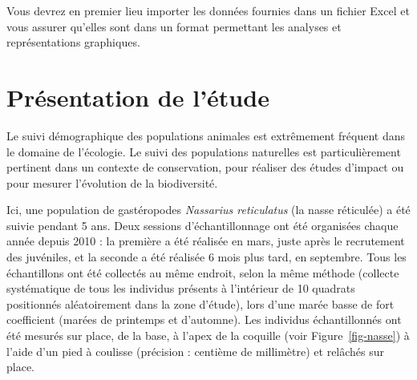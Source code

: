 \documentclass[
  a4paper,
  DIV=11,
  numbers=noendperiod,
  oneside]{scrreprt}
\begin{document}
Vous devrez en premier lieu importer les données fournies dans un
fichier Excel et vous assurer qu'elles sont dans un format permettant
les analyses et représentations graphiques.

\hypertarget{sec-pres}{%
\section{Présentation de l'étude}\label{sec-pres}}

Le suivi démographique des populations animales est extrêmement fréquent
dans le domaine de l'écologie. Le suivi des populations naturelles est
particulièrement pertinent dans un contexte de conservation, pour
réaliser des études d'impact ou pour mesurer l'évolution de la
biodiversité.

Ici, une population de gastéropodes \emph{Nassarius reticulatus} (la
nasse réticulée) a été suivie pendant 5 ans. Deux sessions
d'échantillonnage ont été organisées chaque année depuis 2010 : la
première a été réalisée en mars, juste après le recrutement des
juvéniles, et la seconde a été réalisée 6 mois plus tard, en septembre.
Tous les échantillons ont été collectés au même endroit, selon la même
méthode (collecte systématique de tous les individus présents à
l'intérieur de 10 quadrats positionnés aléatoirement dans la zone
d'étude), lors d'une marée basse de fort coefficient (marées de
printemps et d'automne). Les individus échantillonnés ont été mesurés
sur place, de la base, à l'apex de la coquille (voir
Figure~\ref{fig-nasse}) à l'aide d'un pied à coulisse (précision :
centième de millimètre) et relâchés sur place.
\end{document}

